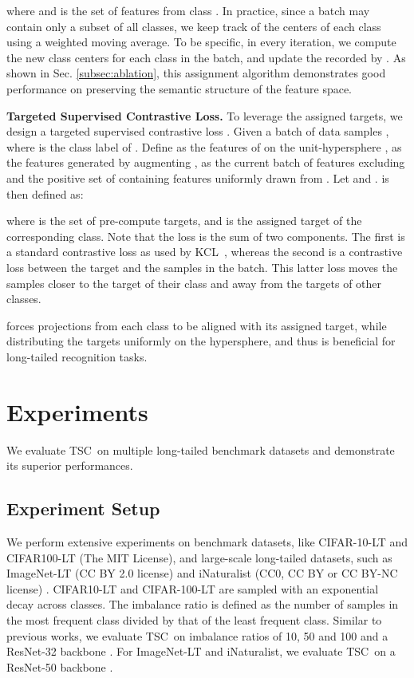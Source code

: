 \documentclass[10pt,twocolumn,letterpaper]{article}
\newcommand{\name} {TSC}
\begin{document}
where  and  is the set of features from class . In practice, since a batch may contain only a subset of all classes, we keep track of the centers of each class using a weighted moving average. To be specific, in every iteration, we compute the new class centers  for each class in the batch, and update the recorded  by . As shown in Sec. \ref{subsec:ablation}, this  assignment algorithm demonstrates good performance on preserving the semantic structure of the feature space.






\noindent\textbf{Targeted Supervised Contrastive Loss.} To leverage the assigned targets, we design a targeted supervised contrastive loss . Given a batch of data samples , where  is the class label of . Define  as the features of  on the unit-hypersphere ,  as the features generated by augmenting ,  as the current batch of features excluding  and  the positive set of  containing  features uniformly drawn from . Let  and .  is then defined as:


where  is the set of pre-compute targets, and  is the assigned target of the corresponding class. Note that the loss is the sum of two components. The first is a standard contrastive loss as used by KCL~\cite{kang2020exploring}, whereas the second is a contrastive loss between the target and the samples in the batch. This latter loss moves the samples closer to the target of their class and away from the targets of other classes.

 forces projections from each class to be aligned with its assigned target, while distributing the targets uniformly on the hypersphere, and thus is  beneficial for long-tailed recognition tasks. 






 \section{Experiments}
\label{sec:results}

We evaluate \name~on multiple long-tailed benchmark datasets and demonstrate its superior performances.

\subsection{Experiment Setup}
\label{subsec:setup}
We perform extensive experiments on benchmark datasets, like CIFAR-10-LT and CIFAR100-LT (The MIT License), and large-scale long-tailed datasets, such as ImageNet-LT (CC BY 2.0 license) \cite{liu2019large} and iNaturalist (CC0, CC BY or CC BY-NC license) \cite{van2018inaturalist}.  CIFAR10-LT and CIFAR-100-LT are sampled with an exponential decay across classes. The imbalance ratio  is defined as the number of samples in the most frequent class divided by that of the least frequent class. Similar to previous works, we evaluate \name~on imbalance ratios of 10, 50 and 100 and a ResNet-32 backbone \cite{yang2020rethinking}. For ImageNet-LT and iNaturalist, we evaluate \name\ on a ResNet-50 backbone \cite{kang2020exploring,kang2019decoupling,wang2020long}.
\end{document}

